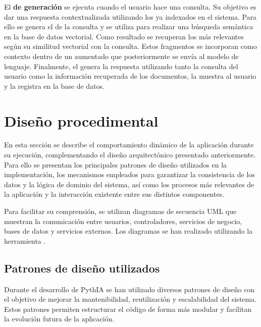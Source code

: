 El \textbf{ de generación} se ejecuta cuando el usuario hace una consulta. Su objetivo es dar una respuesta contextualizada utilizando los  ya indexados en el sistema. Para ello se genera el  de la consulta y se utiliza para realizar una búsqueda semántica en la base de datos vectorial. Como resultado se recuperan los  más relevantes según su similitud vectorial con la consulta. Estos fragmentos se incorporan como contexto dentro de un  aumentado que posteriormente se envía al modelo de lenguaje. Finalmente, el  genera la respuesta utilizando tanto la consulta del usuario como la información recuperada de los documentos, la muestra al usuario y la registra en la base de datos.

\section{Diseño procedimental} \label{dis:proc}

En esta sección se describe el comportamiento dinámico de la aplicación durante su ejecución, complementando el diseño arquitectónico presentado anteriormente. Para ello se presentan los principales patrones de diseño utilizados en la implementación, los mecanismos empleados para garantizar la consistencia de los datos y la lógica de dominio del sistema, así como los procesos más relevantes de la aplicación y la interacción existente entre sus distintos componentes.

Para facilitar su comprensión, se utilizan diagramas de secuencia UML que muestran la comunicación entre usuarios, controladores, servicios de negocio, bases de datos y servicios externos. Los diagramas se han realizado utilizando la herramienta .

\subsection{Patrones de diseño utilizados}

Durante el desarrollo de PythIA se han utilizado diversos patrones de diseño con el objetivo de mejorar la mantenibilidad, reutilización y escalabilidad del sistema. Estos patrones permiten estructurar el código de forma más modular y facilitan la evolución futura de la aplicación.

